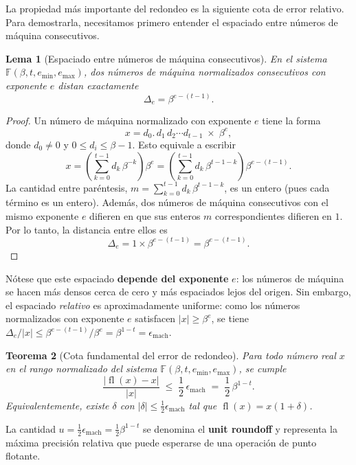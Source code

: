 \documentclass[a4paper,11pt]{report}
\newtheorem{theorem}{Teorema}[chapter]
\newtheorem{lemma}[theorem]{Lema}
\begin{document}
La propiedad más importante del redondeo es la siguiente cota de error relativo. Para demostrarla, necesitamos primero entender el espaciado entre números de máquina consecutivos.

\begin{lemma}[Espaciado entre números de máquina consecutivos]\label{lem:espaciado}
En el sistema $\mathbb{F}(\beta,t,e_{\min},e_{\max})$, dos números de máquina normalizados consecutivos con exponente $e$ distan exactamente
\[
\Delta_e = \beta^{e-(t-1)}.
\]
\end{lemma}

\begin{proof}
Un número de máquina normalizado con exponente $e$ tiene la forma
\[
x = d_0.\,d_1\,d_2\cdots d_{t-1} \;\times\; \beta^e,
\]
donde $d_0\neq 0$ y $0\le d_i\le \beta-1$.  Esto equivale a escribir
\[
x = \left(\sum_{k=0}^{t-1} d_k\,\beta^{-k}\right)\beta^e = \left(\sum_{k=0}^{t-1} d_k\,\beta^{t-1-k}\right)\beta^{e-(t-1)}.
\]
La cantidad entre paréntesis, $m = \sum_{k=0}^{t-1} d_k\,\beta^{t-1-k}$, es un entero (pues cada término es un entero). Además, dos números de máquina consecutivos con el mismo exponente $e$ difieren en que sus enteros $m$ correspondientes difieren en $1$.  Por lo tanto, la distancia entre ellos es
\[
\Delta_e = 1 \times \beta^{e-(t-1)} = \beta^{e-(t-1)}.
\]
\end{proof}

Nótese que este espaciado \textbf{depende del exponente} $e$: los números de máquina se hacen más densos cerca de cero y más espaciados lejos del origen. Sin embargo, el espaciado \textit{relativo} es aproximadamente uniforme: como los números normalizados con exponente $e$ satisfacen $|x|\ge\beta^e$, se tiene $\Delta_e/|x| \le \beta^{e-(t-1)}/\beta^e = \beta^{1-t} = \epsilon_{\text{mach}}$.

\begin{theorem}[Cota fundamental del error de redondeo]\label{thm:cota_redondeo}
Para todo número real $x$ en el rango normalizado del sistema $\mathbb{F}(\beta,t,e_{\min},e_{\max})$, se cumple
\[
\boxed{\frac{|\operatorname{fl}(x)-x|}{|x|} \;\le\; \frac{1}{2}\,\epsilon_{\text{mach}} \;=\; \frac{1}{2}\,\beta^{1-t}.}
\]
Equivalentemente, existe $\delta$ con $|\delta|\le \tfrac{1}{2}\epsilon_{\text{mach}}$ tal que $\operatorname{fl}(x) = x(1+\delta)$.
\end{theorem}

La cantidad $u = \tfrac{1}{2}\epsilon_{\text{mach}} = \tfrac{1}{2}\beta^{1-t}$ se denomina el \textbf{unit roundoff} y representa la máxima precisión relativa que puede esperarse de una operación de punto flotante.
\end{document}
